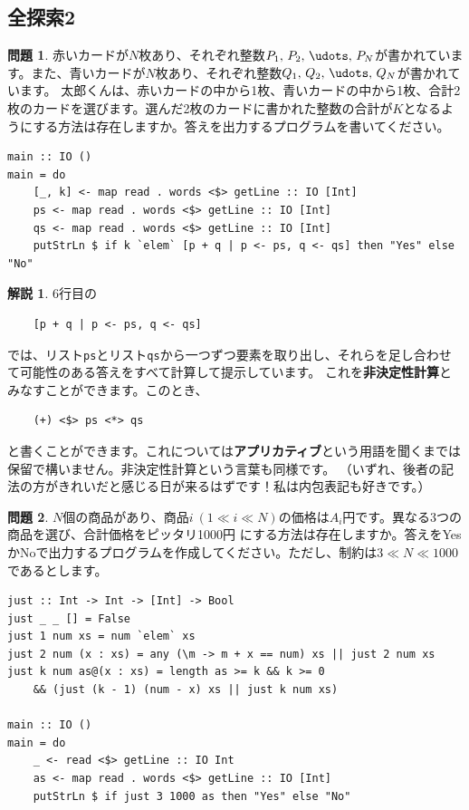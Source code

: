 \documentclass[12pt,a4paper,dvipdfmx,fleqn]{article}%
\theoremstyle{definition}
\newtheorem*{toi*}{問題}
\theoremstyle{definition}
\newtheorem*{ans*}{解説}
\theoremstyle{definition}
\begin{document}
\subsection{全探索2}\label{全探索2}
\begin{toi*}
    赤いカードが$N$枚あり、それぞれ整数$P_1,\,P_2,\,\udots,\,P_N$が書かれています。また、青いカードが$N$枚あり、それぞれ整数$Q_1,\,Q_2,\,\udots,\,Q_N$が書かれています。
    太郎くんは、赤いカードの中から1枚、青いカードの中から1枚、合計2枚のカードを選びます。選んだ2枚のカードに書かれた整数の合計が$K$となるようにする方法は存在しますか。答えを出力するプログラムを書いてください。
\end{toi*}
\begin{lstlisting}[caption=A03.hs,label=A03]
main :: IO ()
main = do
    [_, k] <- map read . words <$> getLine :: IO [Int]
    ps <- map read . words <$> getLine :: IO [Int]
    qs <- map read . words <$> getLine :: IO [Int]
    putStrLn $ if k `elem` [p + q | p <- ps, q <- qs] then "Yes" else "No"
\end{lstlisting}
\begin{ans*}
    6行目の
    \begin{verbatim}
    [p + q | p <- ps, q <- qs]
    \end{verbatim}
    \vspace*{-4mm}
    では、リスト\texttt{ps}とリスト\texttt{qs}から一つずつ要素を取り出し、それらを足し合わせて可能性のある答えをすべて計算して提示しています。
    これを{\bf 非決定性計算}とみなすことができます。このとき、
    \begin{verbatim}
    (+) <$> ps <*> qs
    \end{verbatim}
    \vspace*{-4mm}
    と書くことができます。これについては{\bf アプリカティブ}という用語を聞くまでは保留で構いません。非決定性計算という言葉も同様です。
    （いずれ、後者の記法の方がきれいだと感じる日が来るはずです！私は内包表記も好きです。）
\end{ans*}
\begin{toi*}
    $N$個の商品があり、商品$i~(1\ll i\ll N)$の価格は$A_i$円です。異なる3つの商品を選び、合計価格をピッタリ1000円
    にする方法は存在しますか。答えをYesかNoで出力するプログラムを作成してください。ただし、制約は$3\ll N\ll 1000$であるとします。
\end{toi*}
\begin{lstlisting}[caption=B03.hs,label=B03]
just :: Int -> Int -> [Int] -> Bool
just _ _ [] = False
just 1 num xs = num `elem` xs
just 2 num (x : xs) = any (\m -> m + x == num) xs || just 2 num xs
just k num as@(x : xs) = length as >= k && k >= 0
    && (just (k - 1) (num - x) xs || just k num xs)

main :: IO ()
main = do
    _ <- read <$> getLine :: IO Int
    as <- map read . words <$> getLine :: IO [Int]
    putStrLn $ if just 3 1000 as then "Yes" else "No"
\end{lstlisting}
\end{document}
